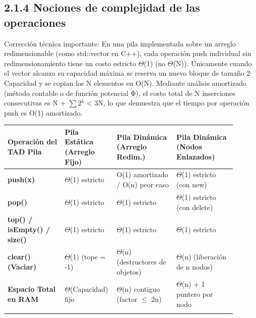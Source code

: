 \documentclass[11pt,letterpaper]{article}
\begin{document}
\subsection*{2.1.4 Nociones de complejidad de las operaciones}
Corrección técnica importante: En una pila implementada sobre un arreglo redimensionable (como std::vector en C++), cada operación push individual sin redimensionamiento tiene un costo estricto $\Theta$(1) (no $\Theta$(N)). Únicamente cuando el vector alcanza su capacidad máxima se reserva un nuevo bloque de tamaño 2$\cdot$Capacidad y se copian los N elementos en O(N). Mediante análisis amortizado (método contable o de función potencial Φ), el costo total de N inserciones consecutivas es N + $\sum$2$^k$ < 3N, lo que demuestra que el tiempo por operación push es O(1) amortizado.\par
\vspace{4pt}\noindent
\begin{tabular}{>{\raggedright\arraybackslash}p{0.222\linewidth}>{\raggedright\arraybackslash}p{0.208\linewidth}>{\raggedright\arraybackslash}p{0.235\linewidth}>{\raggedright\arraybackslash}p{0.235\linewidth}}
\toprule
\textbf{\color{ipnguinda}Operación del TAD Pila} & \textbf{\color{ipnguinda}Pila Estática (Arreglo Fijo)} & \textbf{\color{ipnguinda}Pila Dinámica (Arreglo Redim.)} & \textbf{\color{ipnguinda}Pila Dinámica (Nodos Enlazados)} \\
\midrule
\textbf{push(x)} & $\Theta$(1) estricto & O(1) amortizado / O(n) peor caso & $\Theta$(1) estricto (con new) \\
\addlinespace[3pt]
\textbf{pop()} & $\Theta$(1) estricto & $\Theta$(1) estricto & $\Theta$(1) estricto (con delete) \\
\addlinespace[3pt]
\textbf{top() / isEmpty() / size()} & $\Theta$(1) estricto & $\Theta$(1) estricto & $\Theta$(1) estricto \\
\addlinespace[3pt]
\textbf{clear() (Vaciar)} & $\Theta$(1) (tope = -1) & $\Theta$(n) (destructores de objetos) & $\Theta$(n) (liberación de n nodos) \\
\addlinespace[3pt]
\textbf{Espacio Total en RAM} & $\Theta$(Capacidad) fijo & $\Theta$(n) contiguo (factor $\le$ 2n) & $\Theta$(n) + 1 puntero por nodo \\
\addlinespace[3pt]
\bottomrule
\end{tabular}
\vspace{6pt}\par
\end{document}
